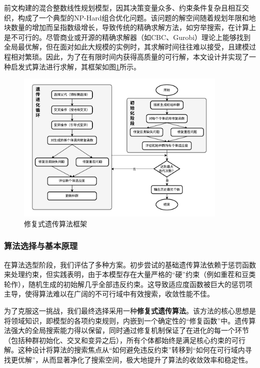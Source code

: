 前文构建的混合整数线性规划模型，因其决策变量众多、约束条件复杂且相互交织，构成了一个典型的NP-Hard组合优化问题。该问题的解空间随着规划年限和地块数量的增加而呈指数级增长，导致传统的精确求解方法，如穷举搜索，在计算上是不可行的。尽管商业或开源的精确求解器（如CBC\cite{1022646313.nh}、Gurobi\cite{JLGX202405002}）理论上能够找到全局最优解，但在面对如此大规模的实例时，其求解时间往往难以接受，且建模过程相对繁琐。因此，为了在有限时间内获得高质量的可行解，本文设计并实现了一种启发式算法进行求解，其框架如图\ref{fig:algorithm_framework}所示。

\begin{figure}[htbp]
    \centering
    \includegraphics[width=0.9\textwidth]{figs/3问题一/遗传算法图.pdf}
    \caption{修复式遗传算法框架}
    \label{fig:algorithm_framework}
\end{figure}


\subsubsection{算法选择与基本原理}

在算法选型阶段，我们评估了多种方案。初步尝试的基础遗传算法依赖于惩罚函数来处理约束，但实践表明，由于本模型存在大量严格的“硬”约束（例如重茬和豆类轮作），随机生成的初始解几乎全部违反约束。这导致适应度函数被巨大的惩罚项主导，使得算法难以在广阔的不可行域中有效搜索，收敛性能不佳。

为了克服这一挑战，我们最终选择采用一种\textbf{修复式遗传算法}\cite{DGWZ202507094}。该方法的核心思想是将领域知识，即模型的各项约束规则，内嵌到一个确定性的“修复函数”中。遗传算法强大的全局搜索能力得以保留，同时通过修复机制保证了在进化的每一个环节（包括种群初始化、交叉和变异之后），所有个体都始终是满足核心约束的可行解。这种设计将算法的搜索焦点从“如何避免违反约束”转移到“如何在可行域内寻找更优解”，从而显著净化了搜索空间，极大地提升了算法的收敛效率和稳定性。


